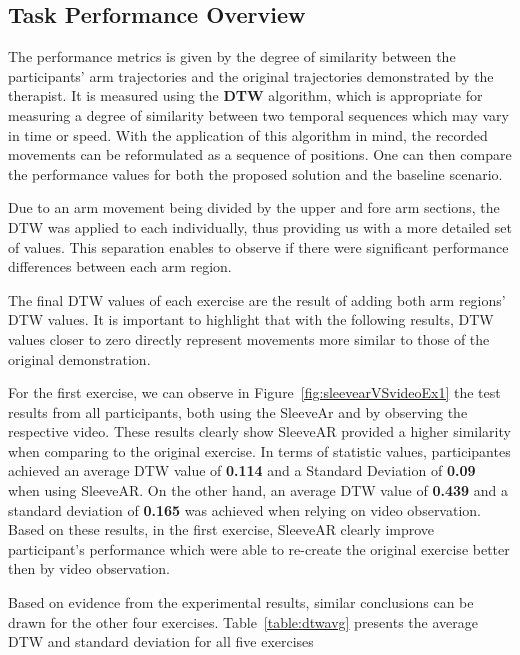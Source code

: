 \subsection{Task Performance Overview}


The performance metrics is given by the degree of similarity between the participants' arm trajectories and the original trajectories demonstrated by the therapist. 
It is measured using the \textbf{\ac{DTW}}  algorithm, which is appropriate for measuring a degree of similarity between two temporal sequences which may vary in time or speed. 
With the application of this algorithm in mind, the recorded movements can be reformulated as a sequence of positions. One can then compare the performance values for both the proposed solution and the baseline scenario.

Due to an arm movement being divided by the upper and fore arm sections, the \ac{DTW} was applied to each individually, thus providing us with a more detailed set of values. This separation enables to observe if there were significant performance differences between each arm region.

The final \ac{DTW} values of each exercise are the result of adding both arm regions' DTW values. It is important to highlight that with the following results, DTW values closer to zero directly represent movements more similar to those of the original demonstration.

For the first exercise, we can observe in Figure~\ref{fig:sleevearVSvideoEx1} the test results from all participants, both using the SleeveAr and by observing the respective video.
These results clearly show SleeveAR provided a higher similarity when comparing to the original exercise. 
In terms of statistic values, participantes achieved an average \ac{DTW} value of \textbf{0.114} and a Standard Deviation of \textbf{0.09} when using SleeveAR.
On the other hand, an average \ac{DTW} value of \textbf{0.439} and a standard deviation of \textbf{0.165} was achieved when relying on video observation. 
Based on these results, in the first exercise, SleeveAR clearly improve participant's performance which were able to re-create the original exercise better then by video observation. 

Based on evidence from the experimental results, similar conclusions can be drawn for the other four exercises. Table~\ref{table:dtwavg} presents the average DTW and standard deviation for all five exercises 

